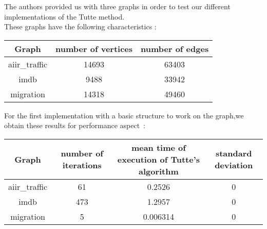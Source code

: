
The authors provided us with three graphs in order to test our
different implementations of the Tutte method.\\

These graphs have the following characteristics :

\begin{center}
\begin{tabular}{|c|c|c|}
\hline
Graph & number of vertices & number of edges \\
\hline
aiir\_traffic & 14693 & 63403\\
imdb & 9488 & 33942\\
migration & 14318 & 49460\\
\hline
\end{tabular}
\end{center}


For the first implementation with a basic structure to
work on the graph,we obtain these results for performance aspect~:

\begin{center}
\begin{tabular}{|c|c|c|c|}
\hline
Graph & number of iterations & mean time of execution of Tutte's algorithm & standard deviation\\
\hline
aiir\_traffic & 61 & 0.2526 & 0\\
imdb & 473 & 1.2957 & 0\\
migration & 5 & 0.006314 & 0\\
\hline

\end{tabular}
\end{center}

